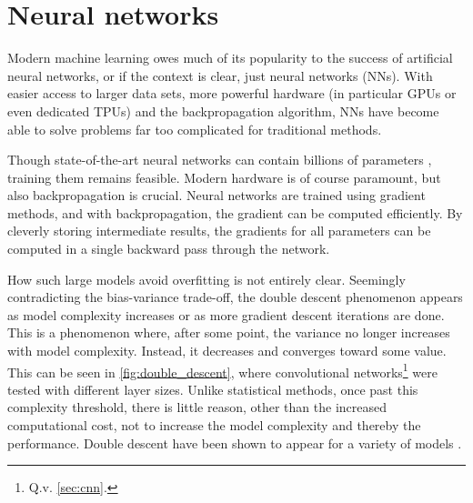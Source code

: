 \section{Neural networks}
\label{sec:nn}
Modern machine learning owes much of its popularity to the success of artificial neural networks, or if the context is clear, just neural networks (NNs).
With easier access to larger data sets, more powerful hardware (in particular GPUs or even dedicated TPUs) and the backpropagation algorithm, NNs have become able to solve problems far too complicated for traditional methods.

Though state-of-the-art neural networks can contain billions of parameters \autocite{smith2022,openai2023}, training them remains feasible.
Modern hardware is of course paramount, but also backpropagation is crucial.
Neural networks are trained using gradient methods, and with backpropagation, the gradient can be computed efficiently.
By cleverly storing intermediate results, the gradients for all parameters can be computed in a single backward pass through the network.

How such large models avoid overfitting is not entirely clear.
Seemingly contradicting the bias-variance trade-off, the double descent phenomenon appears as model complexity increases or as more gradient descent iterations are done.
This is a phenomenon where, after some point, the variance no longer increases with model complexity.
Instead, it decreases and converges toward some value.
This can be seen in \cref{fig:double_descent}, where convolutional networks\footnote{Q.v. \cref{sec:cnn}.} were tested with different layer sizes.
Unlike statistical methods, once past this complexity threshold, there is little reason, other than the increased computational cost, not to increase the model complexity and thereby the performance.
Double descent have been shown to appear for a variety of models \cite{nakkiran2021}.

